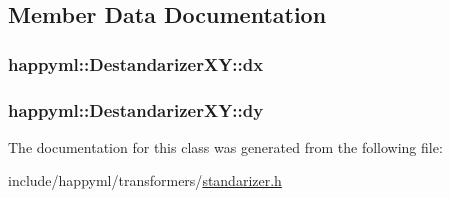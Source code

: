 \subsection{Member Data Documentation}
\subsubsection[{\texorpdfstring{dx}{dx}}]{ happyml\+::\+Destandarizer\+X\+Y\+::dx\hspace{0.3cm}{\ttfamily [protected]}}\hypertarget{classhappyml_1_1DestandarizerXY_aeaa319686a49d6a844cd4c2a259c97ef}{}\label{classhappyml_1_1DestandarizerXY_aeaa319686a49d6a844cd4c2a259c97ef}
\subsubsection[{\texorpdfstring{dy}{dy}}]{ happyml\+::\+Destandarizer\+X\+Y\+::dy\hspace{0.3cm}{\ttfamily [protected]}}\hypertarget{classhappyml_1_1DestandarizerXY_ac482475137a51829da3d1a9f99817960}{}\label{classhappyml_1_1DestandarizerXY_ac482475137a51829da3d1a9f99817960}


The documentation for this class was generated from the following file\+:\begin{DoxyCompactItemize}
\item 
include/happyml/transformers/\hyperlink{standarizer_8h}{standarizer.\+h}\end{DoxyCompactItemize}
